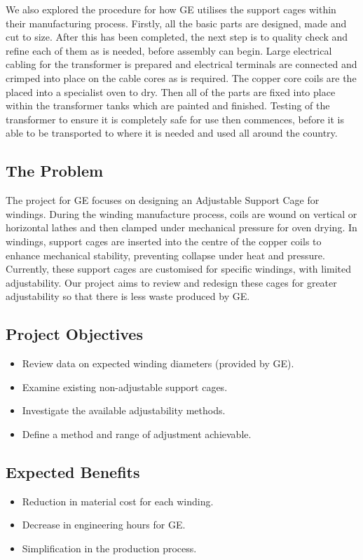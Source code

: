 \documentclass[a4paper,10pt]{article}
\begin{document}
We also explored the procedure for how \gls{GE} utilises the support cages within their manufacturing process. Firstly, all the basic parts are designed, made and cut to size. After this has been completed, the next step is to quality check and refine each of them as is needed, before assembly can begin. Large electrical cabling for the transformer is prepared and electrical terminals are connected and crimped into place on the cable cores as is required. The copper core coils are the placed into a specialist oven to dry. Then all of the parts are fixed into place within the transformer tanks which are painted and finished. Testing of the transformer to ensure it is completely safe for use then commences, before it is able to be transported to where it is needed and used all around the country.

\subsection{The Problem}
The project for \gls{GE} focuses on designing an Adjustable Support Cage for windings. During the winding manufacture process, coils are wound on vertical or horizontal lathes and then clamped under mechanical pressure for oven drying. In windings, support cages are inserted into the centre of the copper coils to enhance mechanical stability, preventing collapse under heat and pressure. Currently, these support cages are customised for specific windings, with limited adjustability. Our project aims to review and redesign these cages for greater adjustability so that there is less waste produced by \gls{GE}.

\subsection{Project Objectives}
\begin{itemize}
  \item Review data on expected winding diameters (provided by \gls{GE}).
  \item Examine existing non-adjustable support cages.
  \item Investigate the available adjustability methods.
  \item Define a method and range of adjustment achievable.
\end{itemize}

\subsection{Expected Benefits}
\begin{itemize}
  \item Reduction in material cost for each winding.
  \item Decrease in engineering hours for \gls{GE}.
  \item Simplification in the production process.
\end{itemize}
\end{document}
